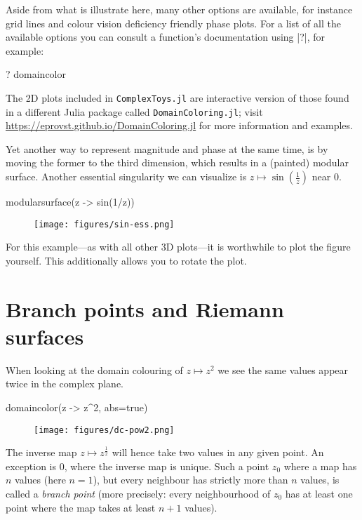 \documentclass[a4paper]{article}
\begin{document}
Aside from what is illustrate here, many other options are available, for
instance grid lines and colour vision deficiency friendly phase plots. For a
list of all the available options you can consult a function's documentation
using \jlv|?|, for example:

\begin{juliaverbatim}
	? domaincolor
\end{juliaverbatim}

The 2D plots included in \texttt{ComplexToys.jl} are interactive version of those
found in a different Julia package called \texttt{DomainColoring.jl}; visit
\url{https://eprovst.github.io/DomainColoring.jl} for more information and
examples.

Yet another way to represent magnitude and phase at the same time, is by moving
the former to the third dimension, which results in a (painted) modular surface.
Another essential singularity we can visualize is
$z \mapsto \sin\left(\frac{1}{z}\right)$ near $0$.

\begin{juliaverbatim}
	modularsurface(z -> sin(1/z))
\end{juliaverbatim}
\begin{figure}[H]
	\centering
	\texttt{[image: figures/sin-ess.png]}
\end{figure}

For this example---as with all other 3D plots---it is worthwhile to plot the
figure yourself. This additionally allows you to rotate the plot.

\section{Branch points and Riemann surfaces}

When looking at the domain colouring of $z \mapsto z^2$ we see the same values
appear twice in the complex plane.

\begin{juliaverbatim}
	domaincolor(z -> z^2, abs=true)
\end{juliaverbatim}
\begin{figure}[H]
	\centering
	\texttt{[image: figures/dc-pow2.png]}
\end{figure}

The inverse map $z \mapsto z^{\frac{1}{2}}$ will hence take two values in any
given point. An exception is $0$, where the inverse map is unique. Such a point
$z_0$ where a map has $n$ values (here $n=1$), but every neighbour has strictly
more than $n$ values, is called a \emph{branch point} (more precisely: every
neighbourhood of $z_0$ has at least one point where the map takes at least $n+1$
values).
\end{document}
